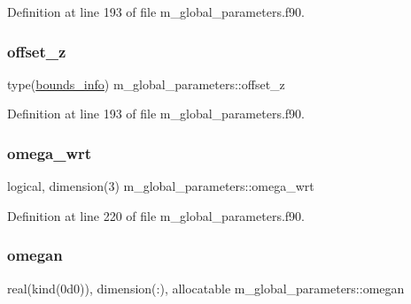 Definition at line 193 of file m\+\_\+global\+\_\+parameters.\+f90.

\mbox{\label{namespacem__global__parameters_aacf46ffa4ec2f27743a20fb3016f2c82}} 
\subsubsection{\texorpdfstring{offset\+\_\+z}{offset\_z}}
{\footnotesize\ttfamily type(\hyperlink{structm__derived__types_1_1bounds__info}{bounds\+\_\+info}) m\+\_\+global\+\_\+parameters\+::offset\+\_\+z}



Definition at line 193 of file m\+\_\+global\+\_\+parameters.\+f90.

\mbox{\label{namespacem__global__parameters_aaf0ab8b40d717a67662251516870b1a6}} 
\subsubsection{\texorpdfstring{omega\+\_\+wrt}{omega\_wrt}}
{\footnotesize\ttfamily logical, dimension(3) m\+\_\+global\+\_\+parameters\+::omega\+\_\+wrt}



Definition at line 220 of file m\+\_\+global\+\_\+parameters.\+f90.

\mbox{\label{namespacem__global__parameters_ae152b49c742928bc52f6da61dd805693}} 
\subsubsection{\texorpdfstring{omegan}{omegan}}
{\footnotesize\ttfamily real(kind(0d0)), dimension(\+:), allocatable m\+\_\+global\+\_\+parameters\+::omegan}



